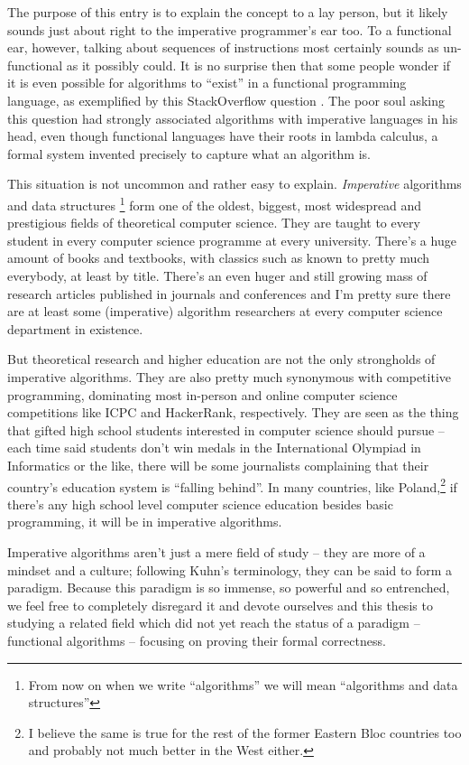 \documentclass[declaration,mgr,english,shortabstract]{iithesis}
\begin{document}
The purpose of this entry is to explain the concept to a lay person, but it likely sounds just about right to the imperative programmer's ear too. To a functional ear, however, talking about sequences of instructions most certainly sounds as un-functional as it possibly could. It is no surprise then that some people wonder if it is even possible for algorithms to ``exist'' in a functional programming language, as exemplified by this StackOverflow question \cite{SO}. The poor soul asking this question had strongly associated algorithms with imperative languages in his head, even though functional languages have their roots in lambda calculus, a formal system invented precisely to capture what an algorithm is.

This situation is not uncommon and rather easy to explain. \textit{Imperative} algorithms and data structures \footnote{From now on when we write ``algorithms'' we will mean ``algorithms and data structures''} form one of the oldest, biggest, most widespread and prestigious fields of theoretical computer science. They are taught to every student in every computer science programme at every university. There's a huge amount of books and textbooks, with classics such as \cite{CLRS} \cite{TAOCP} known to pretty much everybody, at least by title. There's an even huger and still growing mass of research articles published in journals and conferences and I'm pretty sure there are at least some (imperative) algorithm researchers at every computer science department in existence.

But theoretical research and higher education are not the only strongholds of imperative algorithms. They are also pretty much synonymous with competitive programming, dominating most in-person and online computer science competitions like ICPC and HackerRank, respectively. They are seen as the thing that gifted high school students interested in computer science should pursue -- each time said students don't win medals in the International Olympiad in Informatics or the like, there will be some journalists complaining that their country's education system is ``falling behind''. In many countries, like Poland,\footnote{I believe the same is true for the rest of the former Eastern Bloc countries too and probably not much better in the West either.} if there's any high school level computer science education besides basic programming, it will be in imperative algorithms.

Imperative algorithms aren't just a mere field of study -- they are more of a mindset and a culture; following Kuhn's \cite{Kuhn} terminology, they can be said to form a paradigm. Because this paradigm is so immense, so powerful and so entrenched, we feel free to completely disregard it and devote ourselves and this thesis to studying a related field which did not yet reach the status of a paradigm -- functional algorithms -- focusing on proving their formal correctness.
\end{document}
